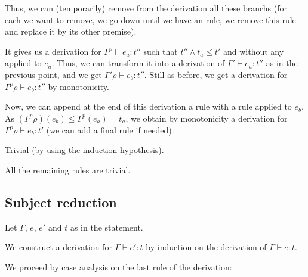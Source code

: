 \documentclass[a4paper]{article}
\theoremstyle{definition}
\begin{document}
\begin{description}
\begin{itemize}
            Thus, we can (temporarily) remove from the derivation all these branchs
            (for each  we want to remove, we go down until we have an  rule,
            we remove this  rule and replace it by its other premise).

            It gives us a derivation for $\Gamma^p \vdash e_a : t''$ such that $t''\land t_a \leq t'$ and without any  applied to $e_a$.
            Thus, we can transform it into a derivation of $\Gamma' \vdash e_a : t''$ as in the previous point, and we get $\Gamma'\rho \vdash e_b : t''$.
            Still as before, we get a derivation for $\Gamma^p\rho\vdash e_b : t''$ by monotonicity.
            
            Now, we can append at the end of this derivation a rule  with a rule  applied to $e_b$.
            As $(\Gamma^p\rho)(e_b) \leq \Gamma^p(e_a) = t_a$, we obtain by monotonicity a derivation for $\Gamma^p\rho\vdash e_b : t'$ (we can add a final  rule if needed).
          \end{itemize}
          
          \item[\Rule{PTypeof}] Trivial (by using the induction hypothesis).
          \item[\Rule{P$\cdots$}] All the remaining rules are trivial.
        \end{description}

        \subsection{Subject reduction}

        Let $\Gamma$, $e$, $e'$ and $t$ as in the statement.

        We construct a derivation for $\Gamma \vdash e':t$ by induction on the derivation of $\Gamma \vdash e:t$.

        We proceed by case analysis on the last rule of the derivation:
        
\end{document}
